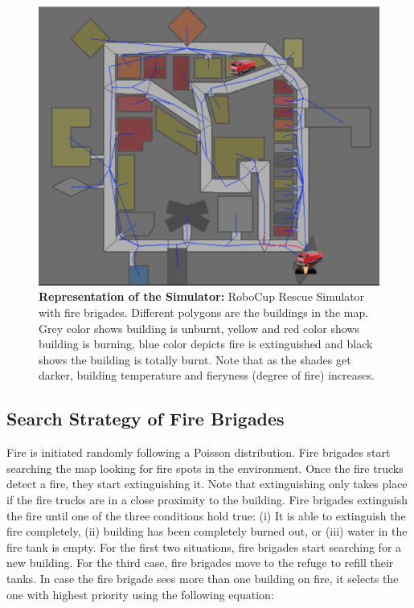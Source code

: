 \documentclass[12pt]{report}
\begin{document}
\begin{figure}[!h]
    \centering
    \includegraphics[width=12cm]{13}
    \caption{\textbf{Representation of the Simulator:} RoboCup Rescue Simulator with fire brigades. Different polygons are the buildings in the map. Grey color shows building is unburnt, yellow and red color shows building is burning, blue color depicts fire is extinguished and black shows the building is totally burnt. Note that as the shades get darker, building temperature and fieryness (degree of fire) increases.}
    \label{fig:RepresentationofSimulator}
\end{figure}

\subsection{Search Strategy of Fire Brigades}

Fire is initiated randomly following a Poisson distribution. Fire brigades start searching the map looking for fire spots in the environment. Once the fire trucks detect a fire, they start extinguishing it. Note that extinguishing only takes place if the fire trucks are in a close proximity to the building. Fire brigades extinguish the fire until one of the three conditions hold true: (i) It is able to extinguish the fire completely, (ii) building has been completely burned out, or (iii) water in the fire tank is empty. For the first two situations, fire brigades start searching for a new building. For the third case, fire brigades move to the refuge to refill their tanks. In case the fire brigade sees more than one building on fire, it selects the one with highest priority using the following equation: 
\end{document}
